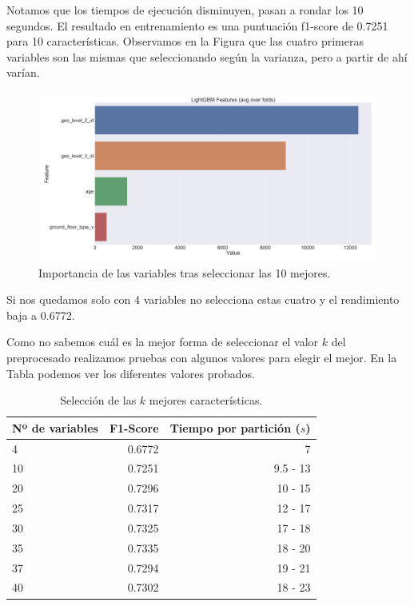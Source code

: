 \documentclass[a4paper, 20pt]{article}
\begin{document}
Notamos que los tiempos de ejecución disminuyen, pasan a rondar los 10 segundos. El resultado en entrenamiento es una puntuación f1-score de 0.7251 para 10 características. Observamos en la Figura 
\label{fig:lgbm_imp_05_10} que las cuatro primeras variables son las mismas que seleccionando según la varianza, pero a partir de ahí varían.
\begin{figure}[H]
    \centering
    \includegraphics[height=0.9\textwidth, width=1.0\textwidth]{lgbm_importances_05_10}
    \caption{Importancia de las variables tras seleccionar las 10 mejores. }
    \label{fig:lgbm_imp_05_10}
\end{figure}

Si nos quedamos solo con 4 variables no selecciona estas cuatro y el rendimiento baja a 0.6772.

Como no sabemos cuál es la mejor forma de seleccionar el valor $k$ del preprocesado realizamos pruebas con algunos valores para elegir el mejor. En la Tabla \label{tab:05_k} podemos ver los diferentes valores probados.

\begin{table}[H]
\centering
\caption{Selección de las $k$ mejores características.}
\label{tab:05_k}
\begin{tabular}{lrr}
\toprule
Nº de variables & F1-Score & Tiempo por partición ($s$)\\
\midrule
4 & 0.6772 & ~7\\
10 & 0.7251 & 9.5 - 13\\
20 & 0.7296 & 10 - 15\\
25 & 0.7317 & 12 - 17\\
30 & 0.7325 & 17 - 18\\
35 & 0.7335 & 18 - 20\\
37 & 0.7294 & 19 - 21\\
40 & 0.7302 & 18 - 23\\
\bottomrule
\end{tabular}
\end{table}
\end{document}
